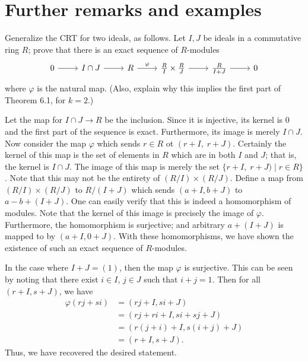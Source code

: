 \documentclass[../../master.tex]{subfiles}
\begin{document}
\section{Further remarks and examples}

\begin{problem}
    Generalize the CRT for two ideals, as follows.
    Let $I, J$ be ideals in a commutative ring $R$; prove that there is an exact sequence of $R$-modules
    \[
        \begin{tikzcd}
                0 & {I \cap J} & R & {\frac{R}{I} \times \frac{R}{J}} & {\frac{R}{I + J}} & 0
                \arrow[from=1-1, to=1-2]
                \arrow[from=1-2, to=1-3]
                \arrow["\varphi", from=1-3, to=1-4]
                \arrow[from=1-4, to=1-5]
                \arrow[from=1-5, to=1-6]
        \end{tikzcd}
    \]
    where $\varphi$ is the natural map. 
    (Also, explain why this implies the first part of Theorem 6.1, for $k = 2$.)
\end{problem}

\begin{solution}
    Let the map for $I \cap J \to R$ be the inclusion.
    Since it is injective, its kernel is 0 and the first part of the sequence is exact.
    Furthermore, its image is merely $I \cap J$.
    Now consider the map $\varphi$ which sends $r \in R$ ot $(r + I, \; r + J)$.
    Certainly the kernel of this map is the set of elements in $R$ which are in both $I$ and $J$;
    that is, the kernel is $I \cap J$.
    The image of this map is merely the set $\{r + I, \; r + J) \mid r \in R\}$.
    Note that this may not be the entirety of $(R / I) \times (R / J)$.
    Define a map from $(R / I) \times (R / J)$ to $R / (I + J)$ which sends $(a + I, b + J)$ to $a - b + (I + J)$.
    One can easily verify that this is indeed a homomorphism of modules.
    Note that the kernel of this image is precisely the image of $\varphi$.
    Furthermore, the homomorphism is surjective;
    and arbitrary $a + (I + J)$ is mapped to by $(a + I, 0 + J)$.
    With these homomorphisms, we have shown the existence of such an exact sequence of $R$-modules.

    In the case where $I + J = (1)$, then the map $\varphi$ is surjective.
    This can be seen by noting that there exist $i \in I$, $j \in J$ such that $i + j = 1$.
    Then for all $(r + I, s + J)$, we have
    \begin{align*}
        \varphi(rj + si) &= (rj + I, si + J) \\
                   &= (rj + ri + I, si + sj + J) \\
                   &= (r(j + i) + I, s(i + j) + J) \\
                   &= (r + I, s + J).
    \end{align*}
    Thus, we have recovered the desired statement.
\end{solution}
\end{document}
